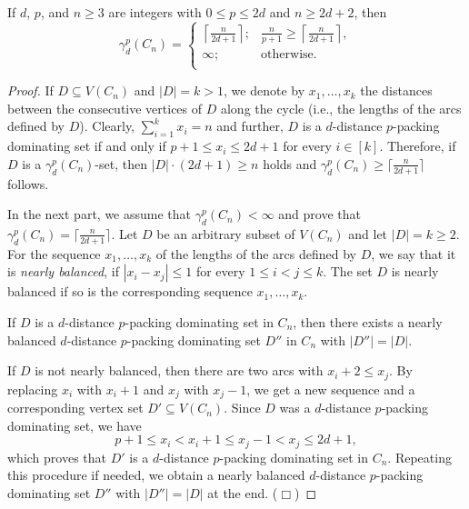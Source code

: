 \documentclass[10pt,a4paper]{amsart}
\newcommand{\smallqed}{{\tiny ($\Box$)}}
\begin{document}
\begin{theorem} \label{thm:cycles}
If $d$, $p$, and $n\ge 3$ are integers with  $0 \leq p \leq 2d$ and $n \ge 2d+2$, then 
 $$
    \gamma_d^p(C_n)=
    \begin{cases}
		\left\lceil\frac{n}{2d+1}\right\rceil; & \frac{n}{p+1} \ge \left\lceil\frac{n}{2d+1} \right\rceil,\\
        	\infty; & \mbox{otherwise}.\\
    \end{cases}
    $$    
\end{theorem}

\begin{proof} If $D \subseteq V(C_n)$ and $|D|=k >1$, we denote by $x_1, \dots, x_k$ the distances between the consecutive vertices of $D$ along the cycle (i.e., the lengths of the arcs defined by $D$). Clearly, $\sum_{i=1}^k x_i=n$ and further, $D$ is a $d$-distance $p$-packing dominating set if and only if $p+1 \le x_i \le 2d+1$  for every $i \in [k]$. Therefore, if $D$ is a $\gamma_d^p(C_n)$-set, then $|D|\cdot (2d+1) \ge n$ holds and $\gamma_d^p(C_n) \ge \lceil\frac{n}{2d+1}\rceil$ follows.
\medskip

In the next part, we assume that $\gamma_d^p(C_n) <\infty$ and prove that $\gamma_d^p(C_n) = \lceil\frac{n}{2d+1}\rceil$. Let $D$ be an arbitrary subset of $V(C_n)$ and let $|D|=k \ge 2$. For the sequence $x_1, \dots, x_k$ of the lengths of the arcs defined by $D$, we say that it is \emph{nearly balanced}, if $|x_i -x_j| \leq 1$ for every $1 \leq i <j \leq k$. The set $D$ is nearly balanced if so is the corresponding sequence $x_1, \dots, x_k$.
\begin{claim} \label{claim:cycles-1}
If $D$ is a $d$-distance $p$-packing dominating set in $C_n$, then there exists a nearly balanced $d$-distance $p$-packing dominating set $D''$ in $C_n$ with $|D''|=|D|$.    
\end{claim}
\proof If $D$ is not nearly balanced, then there are two arcs with $x_i +2 \leq x_j$. By replacing $x_i$ with $x_i+1$ and $x_j$ with $x_j-1$, we get a new sequence and a corresponding vertex set $D' \subseteq V(C_n)$. Since $D$ was a $d$-distance $p$-packing dominating set, we have
$$
p+1 \le x_i <x_i +1 \le x_j-1 <x_j \le 2d+1,
$$
which proves that $D'$ is a $d$-distance $p$-packing dominating set in $C_n$. Repeating this procedure if needed, we obtain a nearly balanced $d$-distance $p$-packing dominating set $D''$ with $|D''|=|D|$ at the end. \smallqed


\end{proof}
\end{document}

